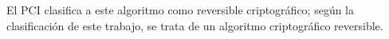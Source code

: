 


%
%
%

El PCI clasifica a este algoritmo como reversible criptográfico; según la
clasificación de este trabajo, se trata de un algoritmo criptográfico
reversible.
